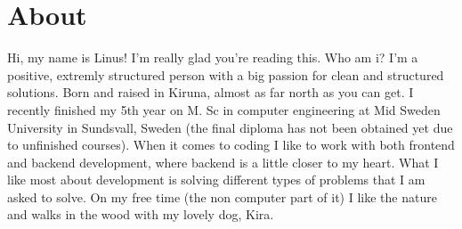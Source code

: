 \section{About}
Hi, my name is Linus! I'm really glad you're reading this.
Who am i? I'm a positive, extremly structured person with a big passion for clean and structured solutions. Born and raised in Kiruna, almost as far north as you can get. I recently finished my 5th  year on M. Sc in computer engineering at Mid Sweden University in Sundsvall, Sweden (the final diploma has not been obtained yet due to unfinished courses). 
When it comes to coding I like to work with both frontend and backend development, where backend is a little closer to my heart.
What I like most about development is solving different types of problems that I am asked to solve.
On my free time (the non computer part of it) I like the nature and walks in the wood with my lovely dog, Kira.
